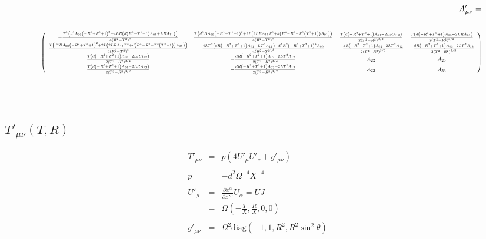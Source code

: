 \documentclass[10pt,letterpaper]{article}
\numberwithin{equation}{section}
\newcommand\scalemath[2]{\scalebox{#1}{\mbox{\ensuremath{\displaystyle #2}}}}
\begin{document}
\begin{eqnarray}
&&A'_{\mu\nu} = 
\\ \nonumber\\
&&
\scalemath{0.65}{
\left(
\begin{array}{cccc}
-\frac{T^2 \left(d^2 A_{00} \left(-R^2+T^2+1\right)^2+4 L R \left(d \left(R^2-T^2-1\right) A_{01}+L R A_{11}\right)\right)}{4 \left(R^2-T^2\right)^3} & \frac{T \left(d^2 R A_{00} \left(-R^2+T^2+1\right)^2+2 L \left(2 L R A_{11} T^2+d \left(R^4-R^2-T^2 \left(T^2+1\right)\right) A_{01}\right)\right)}{4 \left(R^2-T^2\right)^3} & \frac{T \left(d \left(-R^2+T^2+1\right) A_{02}-2 L R A_{12}\right)}{2 \left(T^2-R^2\right)^{3/2}} & \frac{T \left(d \left(-R^2+T^2+1\right) A_{03}-2 L R A_{13}\right)}{2 \left(T^2-R^2\right)^{3/2}} \\
\frac{T \left(d^2 R A_{00} \left(-R^2+T^2+1\right)^2+2 L \left(2 L R A_{11} T^2+d \left(R^4-R^2-T^2 \left(T^2+1\right)\right) A_{01}\right)\right)}{4 \left(R^2-T^2\right)^3} & \frac{4 L T^2 \left(d R \left(-R^2+T^2+1\right) A_{01}-L T^2 A_{11}\right)-d^2 R^2 \left(-R^2+T^2+1\right)^2 A_{00}}{4 \left(R^2-T^2\right)^3} & -\frac{d R \left(-R^2+T^2+1\right) A_{02}-2 L T^2 A_{12}}{2 \left(T^2-R^2\right)^{3/2}} & -\frac{d R \left(-R^2+T^2+1\right) A_{03}-2 L T^2 A_{13}}{2 \left(T^2-R^2\right)^{3/2}} \\
\frac{T \left(d \left(-R^2+T^2+1\right) A_{02}-2 L R A_{12}\right)}{2 \left(T^2-R^2\right)^{3/2}} & -\frac{d R \left(-R^2+T^2+1\right) A_{02}-2 L T^2 A_{12}}{2 \left(T^2-R^2\right)^{3/2}} & A_{22} & A_{23} \\
\frac{T \left(d \left(-R^2+T^2+1\right) A_{03}-2 L R A_{13}\right)}{2 \left(T^2-R^2\right)^{3/2}} & -\frac{d R \left(-R^2+T^2+1\right) A_{03}-2 L T^2 A_{13}}{2 \left(T^2-R^2\right)^{3/2}} & A_{23} & A_{33} \\
\end{array}
\right)
}
\nonumber
\end{eqnarray}
%
%
%
\\ \\
\subsection{$T'_{\mu\nu}(T,R)$}
\begin{eqnarray}
T'_{\mu\nu} &=& p(4U'_\mu U'_\nu + g'_{\mu\nu})
\\ \nonumber\\
p &=& -d^2 \Omega^{-4} X^{-4}
\\ \nonumber\\
U'_{\mu} &=& \frac{\partial x^\alpha}{\partial x'^\mu}U_\alpha = U J
\nonumber\\
&=& \Omega \left( -\frac{T}{X},\frac{R}{X},0,0\right) 
\\ \nonumber\\
g'_{\mu\nu} &=& \Omega^2 \text{diag}\left(-1,1,R^2,R^2\sin^2\theta\right)
\end{eqnarray}
%
%
%
%
\end{document}
